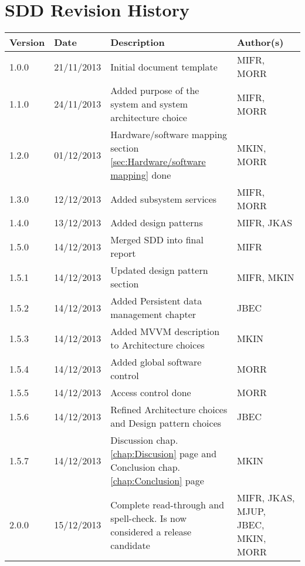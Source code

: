 \section{SDD Revision History}
\begin{center}
    \begin{tabular}{ | l | l | p{6cm} | p{4cm} |}
    \hline
    Version & Date & Description & Author(s) 
    \\ \hline
    1.0.0 & 21/11/2013 & Initial document template & MIFR, MORR
    \\ \hline
    1.1.0 & 24/11/2013 & Added purpose of the system and system architecture choice & MIFR, MORR
    \\ \hline
    1.2.0 & 01/12/2013 & Hardware/software mapping section \ref{sec:Hardware/software mapping} done & MKIN, MORR
    \\ \hline
    1.3.0 & 12/12/2013 & Added subsystem services & MIFR, MORR
    \\ \hline
    1.4.0 & 13/12/2013 & Added design patterns & MIFR, JKAS
    \\ \hline
    1.5.0 & 14/12/2013 & Merged SDD into final report & MIFR
    \\ \hline
    1.5.1 & 14/12/2013 & Updated design pattern section & MIFR, MKIN
    \\ \hline
    1.5.2 & 14/12/2013 & Added Persistent data management chapter & JBEC
    \\ \hline
    1.5.3 & 14/12/2013 & Added MVVM description to Architecture choices & MKIN
    \\ \hline
    1.5.4 & 14/12/2013 & Added global software control & MORR
    \\ \hline
    1.5.5 & 14/12/2013 & Access control done & MORR
    \\ \hline
    1.5.6 & 14/12/2013 & Refined Architecture choices and Design pattern choices & JBEC
    \\ \hline
    1.5.7 & 14/12/2013 & Discussion chap. \ref{chap:Discusion} page \pageref{chap:Discusion} and Conclusion chap. \ref{chap:Conclusion} page \pageref{chap:Conclusion} & MKIN
    \\ \hline
    2.0.0 & 15/12/2013 & Complete read-through and spell-check. Is now considered a release candidate & MIFR, JKAS, MJUP, JBEC, MKIN, MORR
    \\ \hline
    \end{tabular}
\end{center}


